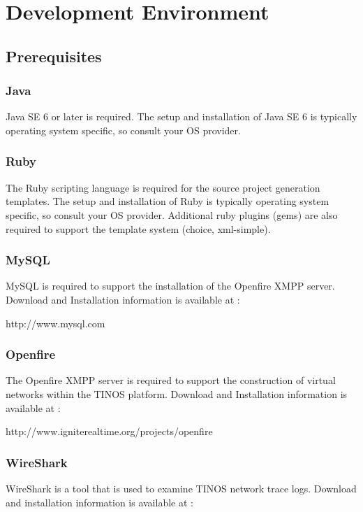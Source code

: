 \chapter{Development Environment}

\section{Prerequisites}
\subsection{Java}
Java SE 6 or later is required. The setup and installation of Java SE 6 is typically
operating system specific, so consult your OS provider. 

\subsection{Ruby}
The Ruby scripting language is required for the source project generation templates. The setup
and installation of Ruby is typically operating system specific, so consult your OS provider.  
Additional ruby plugins (gems) are also required to support the template system (choice,
xml-simple).

\subsection{MySQL}
MySQL is required to support the installation of the Openfire XMPP server.
Download and Installation information is available at :

\begin{center}
http://www.mysql.com
\end{center}

\subsection{Openfire}
The Openfire XMPP server is required to support the construction of virtual
networks within the TINOS platform. Download and Installation information
is available at :

\begin{center}
http://www.igniterealtime.org/projects/openfire
\end{center}

\subsection{WireShark}
WireShark is a tool that is used to examine TINOS network trace logs.
Download and installation information is available at :

